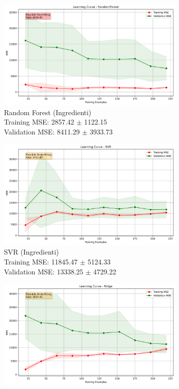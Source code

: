 \documentclass[12pt,a4paper]{article}
\begin{document}
\begin{figure}[H]
\centering
\begin{subfigure}{0.32\textwidth}
    \includegraphics[width=\textwidth]{dati/learning_curve_randomforest.png}
    \caption{Random Forest (Ingredienti)\\Training MSE: 2857.42 $\pm$ 1122.15\\Validation MSE: 8411.29 $\pm$ 3933.73}
\end{subfigure}
\hfill
\begin{subfigure}{0.32\textwidth}
    \includegraphics[width=\textwidth]{dati/learning_curve_svr.png}
    \caption{SVR (Ingredienti)\\Training MSE: 11845.47 $\pm$ 5124.33\\Validation MSE: 13338.25 $\pm$ 4729.22}
\end{subfigure}
\hfill
\begin{subfigure}{0.32\textwidth}
    \includegraphics[width=\textwidth]{dati/learning_curve_ridge.png}

\end{subfigure}
\end{figure}
\end{document}
